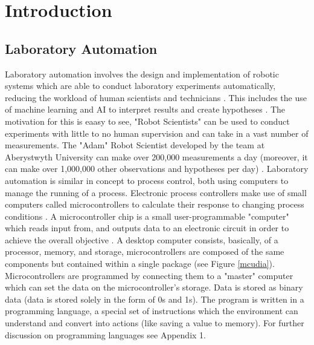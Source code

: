 \documentclass[a4]{report}
\begin{document}
	\newpage
	\setcounter{page}{1}
	
	\chapter*{Introduction}



	\section{Laboratory Automation}
	Laboratory automation involves the design and implementation of robotic systems which are able to conduct laboratory experiments automatically, reducing the workload of human scientists and technicians \cite{backwhatisauto}. This includes the use of machine learning and AI to interpret results and create hypotheses \cite{backlitrevai, backbaconauto, backlabauto}. The motivation for this is eaasy to see, "Robot Scientists" can be used to conduct experiments with little to no human supervision and can take in a vast number of measurements. The "Adam" Robot Scientist developed by the team at Aberystwyth University can make over 200,000 measurements a day (moreover, it can make over 1,000,000 other observations and hypotheses per day)  \cite{backontorobsci}.\newline \newline \noindent
	Laboratory automation is similar in concept to process control, both using computers to manage the running of a process. Electronic process controllers make use of small computers called microcontrollers to calculate their response to changing process conditions \cite{backprocautotheory}. A microcontroller chip is a small user-programmable "computer" which reads input from, and outputs data to an electronic circuit in order to achieve the overall objective \cite{backwhatismc}. A desktop computer consists, basically, of a processor, memory, and storage, microcontrollers are composed of the same components but contained within a single package (see Figure \ref{mcudia}). Microcontrollers are programmed by connecting them to a "master" computer which can set the data on the microcontroller's storage. Data is stored as binary data (data is stored solely in the form of 0s and 1s). The program is written in a programming language, a special set of instructions which the environment can understand and convert into actions (like saving a value to memory). For further discussion on programming languages see Appendix 1.
\end{document}
